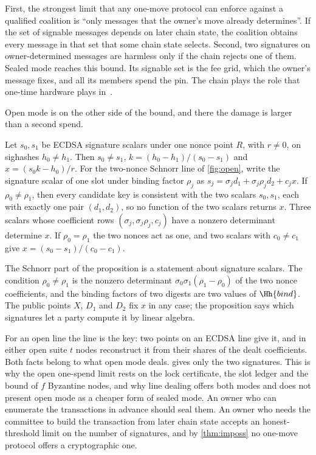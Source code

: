 First, the strongest limit that any one-move protocol can enforce against a qualified coalition is ``only messages that the owner's move already determines''. If the set of signable messages depends on later chain state, the coalition obtains every message in that set that some chain state selects. Second, two signatures on owner-determined messages are harmless only if the chain rejects one of them. Sealed mode reaches this bound. Its signable set is the fee grid, which the owner's message fixes, and all its members spend the pin. The chain plays the role that one-time hardware plays in~\cite{GKR08}.

Open mode is on the other side of the bound, and there the damage is larger than a second spend.

\begin{proposition}\label{prop:twopoints}
Let $s_0, s_1$ be ECDSA signature scalars under one nonce point $R$, with $r \neq 0$, on sighashes $h_0 \neq h_1$. Then $s_0 \neq s_1$, $k = (h_0 - h_1)/(s_0 - s_1)$ and $x = (s_0 k - h_0)/r$. For the two-nonce Schnorr line of \cref{fig:open}, write the signature scalar of one slot under binding factor $\rho_j$ as $s_j = \sigma_j d_1 + \sigma_j \rho_j d_2 + c_j x$. If $\rho_0 \neq \rho_1$, then every candidate key is consistent with the two scalars $s_0, s_1$, each with exactly one pair $(d_1, d_2)$, so no function of the two scalars returns $x$. Three scalars whose coefficient rows $(\sigma_j, \sigma_j\rho_j, c_j)$ have a nonzero determinant determine $x$. If $\rho_0 = \rho_1$ the two nonces act as one, and two scalars with $c_0 \neq c_1$ give $x = (s_0 - s_1)/(c_0 - c_1)$.
\end{proposition}

The Schnorr part of the proposition is a statement about signature scalars. The condition $\rho_0 \neq \rho_1$ is the nonzero determinant $\sigma_0\sigma_1(\rho_1 - \rho_0)$ of the two nonce coefficients, and the binding factors of two digests are two values of $\Hh{bind}$. The public points $X$, $D_1$ and $D_2$ fix $x$ in any case; the proposition says which signatures let a party compute it by linear algebra.

For an open line the line is the key: two points on an ECDSA line give it, and in either open suite $t$ nodes reconstruct it from their shares of the dealt coefficients. Both facts belong to what open mode deals.  gives only the two signatures. This is why the open one-spend limit rests on the lock certificate, the slot ledger and the bound of $f$ Byzantine nodes, and why line dealing offers both modes and does not present open mode as a cheaper form of sealed mode. An owner who can enumerate the transactions in advance should seal them. An owner who needs the committee to build the transaction from later chain state accepts an honest-threshold limit on the number of signatures, and by \cref{thm:imposs} no one-move protocol offers a cryptographic one.
